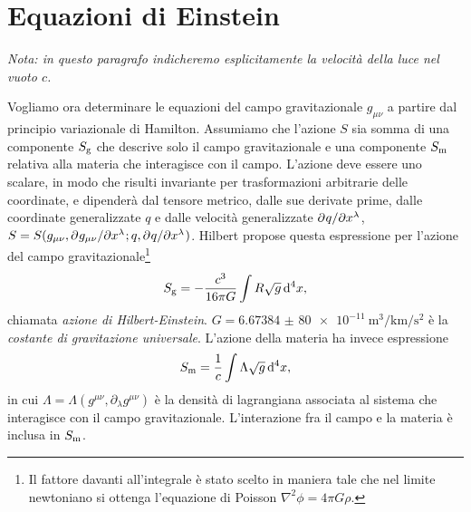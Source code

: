 \subsection{}
\label{sec:deviazione-geodetica}

\section{Equazioni di Einstein}
\label{sec:equazioni-einstein}

\emph{Nota: in questo paragrafo indicheremo esplicitamente la velocità della
  luce nel vuoto $c$.}

Vogliamo ora determinare le equazioni del campo gravitazionale $g_{\mu\nu}$ a
partire dal principio variazionale di Hamilton.  Assumiamo che l'azione $S$ sia
somma di una componente $S_{\textup{g}}$ che descrive solo il campo
gravitazionale e una componente $S_{\textup{m}}$ relativa alla materia che
interagisce con il campo.  L'azione deve essere uno scalare, in modo che risulti
invariante per trasformazioni arbitrarie delle coordinate, e dipenderà dal
tensore metrico, dalle sue derivate prime, dalle coordinate generalizzate $q$ e
dalle velocità generalizzate $\partial^{} q / \partial {x^{\lambda}}^{}$,
$S = S(g_{\mu\nu}, \partial^{} g_{\mu\nu} / \partial {x^{\lambda}}^{}; q,
\partial^{} q / \partial {x^{\lambda}}^{})$.
Hilbert propose questa espressione per l'azione del campo
gravitazionale\footnote{Il fattore davanti all'integrale è stato scelto in
  maniera tale che nel limite newtoniano si ottenga l'equazione di Poisson
  $\nabla^{2} \phi = 4\pi G\rho$.}
\begin{equation}
  S_{\textup{g}} = -\frac{c^{3}}{16\pi G} \int R \sqrt{g} \mathop{}\!\mathrm{d}^{4} x,
\end{equation}
chiamata  \emph{azione di Hilbert-Einstein}.
$G = \SI{6.673 84(80)e-11}{\cubic\metre\per\kilo\metre\per\second\squared}$ è la
\emph{costante di gravitazione universale}.  L'azione della materia ha invece
espressione
\begin{equation}
  S_{\textup{m}} = \frac{1}{c} \int \Lambda \sqrt{g} \mathop{}\!\mathrm{d}^{4} x,
\end{equation}
in cui $\Lambda = \Lambda(g^{\mu\nu}, \partial_{\lambda}g^{\mu\nu})$ è la densità
di lagrangiana associata al sistema che interagisce con il campo
gravitazionale.  L'interazione fra il campo e la materia è inclusa in
$S_{\textup{m}}$.

